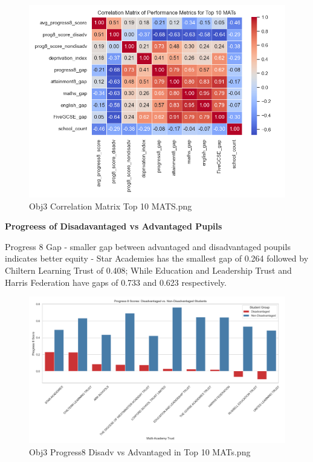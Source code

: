 \documentclass[
  letterpaper,
  DIV=11,
  numbers=noendperiod]{scrartcl}
\begin{document}
\begin{figure}[H]

{\centering \includegraphics{images/Obj3_Correlation Matrix top 10 MATS.png}

}

\caption{Obj3 Correlation Matrix Top 10 MATS.png}

\end{figure}%

\textbf{Progreess of Disadavantaged vs Advantaged Pupils}

Progress 8 Gap - smaller gap between advantaged and disadvantaged
poupils indicates better equity - Star Academies has the smallest gap of
0.264 followed by Chiltern Learning Trust of 0.408; While Education and
Leadership Trust and Harris Federation have gaps of 0.733 and 0.623
respectively.

\begin{figure}[H]

{\centering \includegraphics{images/Obj3_Progress8 disadv vs advantaged in top 10 MATs.png}

}

\caption{Obj3 Progress8 Disadv vs Advantaged in Top 10 MATs.png}

\end{figure}%
\end{document}
